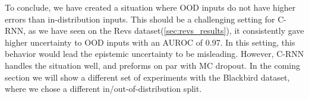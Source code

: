 To conclude, we have created a situation where OOD inputs do not have higher errors than in-distribution inputs. This should be a challenging setting for C-RNN, as we have seen on the Revs dataset(\cref{sec:revs_results}), it consistently gave higher uncertainty to OOD inputs with an AUROC of 0.97. In this setting, this behavior would lead the epistemic uncertainty to be misleading. However, C-RNN handles the situation well, and preforms on par with MC dropout. In the coming section we will show a different set of experiments with the Blackbird dataset, where we chose a different in/out-of-distribution split. 
